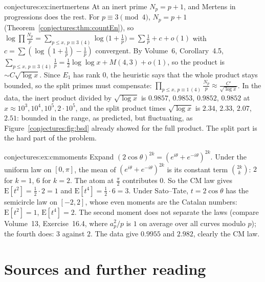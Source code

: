 \begin{solution}{conjectures:ex:inertmertens}
\idea At an inert prime $N_p=p+1$, and Mertens in progressions does the rest.
\writeup For $p\equiv3\pmod4$, $N_p=p+1$ (Theorem~\ref{conjectures:thm:countEn}), so $\log\prod\frac{N_p}p=\sum_{p\le x,\,p\equiv3\,(4)}\log\bigl(1+\frac1p\bigr)
=\sum\frac1p+c+o(1)$ with $c=\sum(\log(1+\frac1p)-\frac1p)$ convergent. By Volume~6, Corollary~4.5, $\sum_{p\le x,\,p\equiv3\,(4)}\frac1p=\frac12\log\log x+M(4,3)+o(1)$,
so the product is $\sim C\sqrt{\log x}$. Since $E_1$ has rank $0$, the heuristic says that the whole product stays bounded, so the split primes must
compensate: $\prod_{p\le x,\,p\equiv1\,(4)}\frac{N_p}p\approx\frac{C'}{\sqrt{\log x}}$. In the data, the inert product divided by $\sqrt{\log x}$ is $0.9857$,
$0.9853$, $0.9852$, $0.9852$ at $x\approx10^3,10^4,10^5,2\cdot10^5$, and the split product times $\sqrt{\log x}$ is $2.34$, $2.33$, $2.07$, $2.51$: bounded
in the range, as predicted, but fluctuating, as Figure~\ref{conjectures:fig:bsd} already showed for the full product. The split part is the hard part of the problem.
\end{solution}

\begin{solution}{conjectures:ex:cmmoments}
\idea Expand $(2\cos\theta)^{2k}=(e^{i\theta}+e^{-i\theta})^{2k}$.
\writeup Under the uniform law on $[0,\pi]$, the mean of $(e^{i\theta}+e^{-i\theta})^{2k}$ is its constant term $\binom{2k}k$: $2$ for $k=1$, $6$ for $k=2$. The
atom at $\frac\pi2$ contributes $0$. So the CM law gives $\mathrm E[t^2]=\frac12\cdot2=1$ and $\mathrm E[t^4]=\frac12\cdot6=3$. Under Sato--Tate, $t=2\cos\theta$ has
the semicircle law on $[-2,2]$, whose even moments are the Catalan numbers: $\mathrm E[t^2]=1$, $\mathrm E[t^4]=2$. The second moment does not separate the
laws (compare Volume~13, Exercise~16.4, where $a_p^2/p$ is $1$ on average over all curves modulo $p$); the fourth does: $3$ against $2$. The data give $0.9955$ and $2.982$, clearly the CM law.
\end{solution}

\section*{Sources and further reading}

